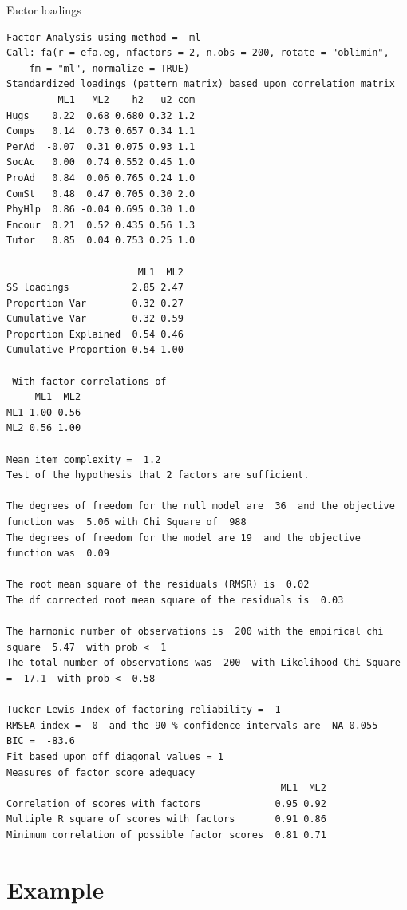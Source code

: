 \documentclass[10pt,ignorenonframetext,]{beamer}
\begin{document}
\begin{frame}[fragile]{Factor loadings}

\tiny

\begin{verbatim}
Factor Analysis using method =  ml
Call: fa(r = efa.eg, nfactors = 2, n.obs = 200, rotate = "oblimin", 
    fm = "ml", normalize = TRUE)
Standardized loadings (pattern matrix) based upon correlation matrix
         ML1   ML2    h2   u2 com
Hugs    0.22  0.68 0.680 0.32 1.2
Comps   0.14  0.73 0.657 0.34 1.1
PerAd  -0.07  0.31 0.075 0.93 1.1
SocAc   0.00  0.74 0.552 0.45 1.0
ProAd   0.84  0.06 0.765 0.24 1.0
ComSt   0.48  0.47 0.705 0.30 2.0
PhyHlp  0.86 -0.04 0.695 0.30 1.0
Encour  0.21  0.52 0.435 0.56 1.3
Tutor   0.85  0.04 0.753 0.25 1.0

                       ML1  ML2
SS loadings           2.85 2.47
Proportion Var        0.32 0.27
Cumulative Var        0.32 0.59
Proportion Explained  0.54 0.46
Cumulative Proportion 0.54 1.00

 With factor correlations of 
     ML1  ML2
ML1 1.00 0.56
ML2 0.56 1.00

Mean item complexity =  1.2
Test of the hypothesis that 2 factors are sufficient.

The degrees of freedom for the null model are  36  and the objective function was  5.06 with Chi Square of  988
The degrees of freedom for the model are 19  and the objective function was  0.09 

The root mean square of the residuals (RMSR) is  0.02 
The df corrected root mean square of the residuals is  0.03 

The harmonic number of observations is  200 with the empirical chi square  5.47  with prob <  1 
The total number of observations was  200  with Likelihood Chi Square =  17.1  with prob <  0.58 

Tucker Lewis Index of factoring reliability =  1
RMSEA index =  0  and the 90 % confidence intervals are  NA 0.055
BIC =  -83.6
Fit based upon off diagonal values = 1
Measures of factor score adequacy             
                                                ML1  ML2
Correlation of scores with factors             0.95 0.92
Multiple R square of scores with factors       0.91 0.86
Minimum correlation of possible factor scores  0.81 0.71
\end{verbatim}

\end{frame}

\section{Example}\label{example}
\end{document}
